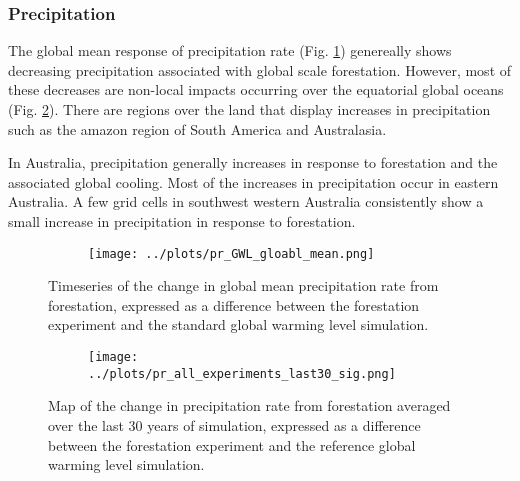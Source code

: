 \documentclass[]{article}
\begin{document}
\subsubsection{Precipitation}

The global mean response of precipitation rate (Fig. \ref{fig:global_pr_timeseries})
genereally shows decreasing precipitation associated with global scale forestation.
However, most of these decreases are non-local impacts occurring over the equatorial global oceans (Fig. \ref{fig:pr_map}).
There are regions over the land that display increases in precipitation such as the amazon region of South America and Australasia.

In Australia, precipitation generally increases in response to forestation and the associated global cooling.
Most of the increases in precipitation occur in eastern Australia.
A few grid cells in southwest western Australia consistently show a small increase in precipitation in response to forestation.

\begin{figure}[H]
    \centering
    \begin{subfigure}[b]{\linewidth}
        \texttt{[image: ../plots/pr\_GWL\_gloabl\_mean.png]}
    \end{subfigure}
    \caption{Timeseries of the change in global mean precipitation rate from forestation, expressed as a difference between the forestation experiment and the standard global warming level simulation.}
    \label{fig:global_pr_timeseries}
\end{figure}

\begin{figure}[H]
    \centering
    \begin{subfigure}[b]{\linewidth}
        \texttt{[image: ../plots/pr\_all\_experiments\_last30\_sig.png]}
    \end{subfigure}
    \caption{Map of the change in precipitation rate from forestation averaged over the last 30 years of simulation, expressed as a difference between the forestation experiment and the reference global warming level simulation.}
    \label{fig:pr_map}
\end{figure}
\end{document}
